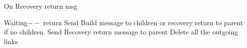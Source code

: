 \documentclass{article}
\begin{document}
\begin{algorithm}
\caption{On Recovery return msg}
\label{Recovery return message received}
\begin{algorithmic}[1]
\State Waiting$--$
\State return
\EndIf
{}
\State Send Build message to children or recovery return to parent if no children.
\State Send Recovery return message to parent
\State Delete all the outgoing links
\EndIf
\EndProcedure
\end{algorithmic}
\end{algorithm}	
\end{document}
